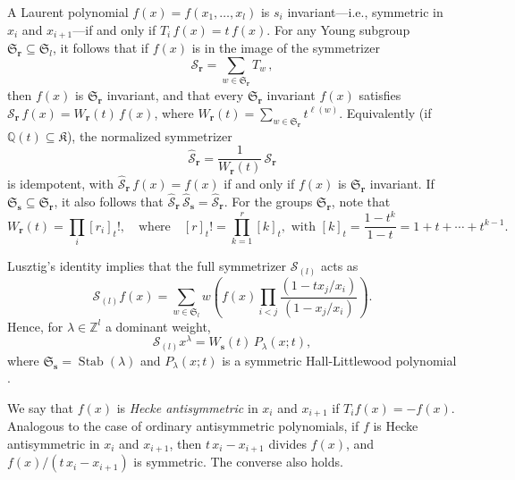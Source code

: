 \documentclass[12pt]{amsart}
\theoremstyle{definition}
\theoremstyle{remark}
\newcommand{\QQ}{{\mathbb Q}}
\newcommand{\ZZ}{{\mathbb Z}}
\newcommand{\rr}{{\mathbf r}}
\newcommand{\sS}{{\mathbf s}}
\newcommand{\Kfrak}{{\mathfrak K}}
\newcommand{\Sfrak}{{\mathfrak S}}
\newcommand{\Scal}{{\mathcal S}}
\DeclareMathOperator{\Stab}{Stab}
\newcommand{\hsym}{\widehat{\Scal}}    %
\begin{document}
A Laurent polynomial $f(x) = f(x_{1},\ldots,x_{l})$ is $s_{i}$
invariant---i.e., symmetric in $x_{i}$ and $x_{i+1}$---if and only if
$T_{i} \, f(x) = t\, f(x)$.  For any Young subgroup $\Sfrak _{\rr
}\subseteq \Sfrak _{l}$, it follows that if $f(x)$ is in the image of
the symmetrizer
\begin{equation}\label{e:Hecke-symmetrizer}
\Scal _{\rr} = \sum _{w\in \Sfrak _{\rr }} T_{w}\, ,
\end{equation}
then $f(x)$ is $\Sfrak _{\rr }$ invariant, and that every $\Sfrak
_{\rr }$ invariant $f(x)$ satisfies $\Scal _{\rr }\, f(x) = W_{\rr
}(t)\, f(x)$, where $W_{\rr }(t) = \sum _{w\in \Sfrak _{\rr }} t^{\ell
(w)}$.  Equivalently (if $\QQ (t)\subseteq \Kfrak $), the normalized
symmetrizer
\begin{equation}\label{e:normalized-Hecke-symmetrizer}
\hsym  _{\rr} = \frac{1}{W_{\rr }(t)}\, \Scal _{\rr }
\end{equation}
is idempotent, with $\hsym _{\rr}\, f(x) = f(x)$ if and only if $f(x)$
is $\Sfrak _{\rr }$ invariant.  If $\Sfrak _{\sS }\subseteq \Sfrak
_{\rr }$, it also follows that $\hsym _{\rr}\, \hsym _{\sS } = \hsym
_{\rr }$.  For the groups $\Sfrak _{\rr }$, note that
\begin{equation}\label{e:W(t)}
W_{\rr}(t) = \prod _{i} [r_{i}]_{t}!, \quad \text{where}\quad
[r]_{t}!=\prod _{k=1}^{r} [k]_{t}, \text{ with } [k]_{t} =
\frac{1-t^{k}}{1-t} = 1+t+\cdots +t^{k-1}.
\end{equation}

Lusztig's identity \cite[Theorem~6.6]{Lusztig83} implies that the full
symmetrizer $\Scal  _{(l)}$ acts as
\begin{equation}\label{e:full-Sl-formula}
\Scal _{(l)} f(x) = \sum _{w\in \Sfrak _{l}} w \left( f(x) \prod
_{i<j} \frac{(1 - t x_{j}/x_{i})}{(1 - x_{j}/x_{i})} \right).
\end{equation}
Hence, for $\lambda \in \ZZ ^{l}$ a dominant weight,
\begin{equation}\label{e:Sl-to-symmetric-HL}
\Scal _{(l)} x^{\lambda } = W_{\sS }(t)\, P_{\lambda }(x;t),
\end{equation}
where $\Sfrak _{\sS } = \Stab (\lambda )$ and $P_{\lambda }(x;t)$ is a 
symmetric Hall-Littlewood polynomial \cite[III,~(2.1)]{Macdonald95}.

We say that $f(x)$ is {\em Hecke antisymmetric} in $x_{i}$ and
$x_{i+1}$ if $T_{i}f(x) = -f(x)$.  Analogous to the case of ordinary
antisymmetric polynomials, if $f$ is Hecke antisymmetric in $x_{i}$
and $x_{i+1}$, then $t\, x_{i} - x_{i+1}$ divides $f(x)$, and
$f(x)/(t\, x_{i} - x_{i+1})$ is symmetric.  The converse also holds.
\end{document}
